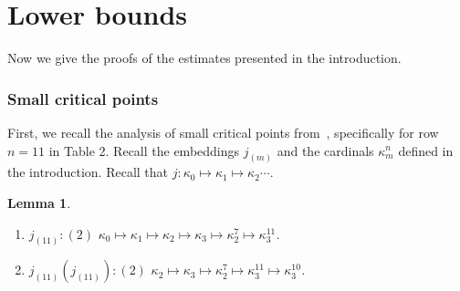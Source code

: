 \documentclass{article}
\newtheorem{lemma}{Lemma}[section]
\theoremstyle{definition}
\theoremstyle{remark}
\begin{document}



\section{Lower bounds}
\label{sec:lower_bounds}

Now we give the proofs of the estimates presented in the introduction.


\subsubsection*{Small critical points}

First, we recall the analysis of small critical points from~\cite{Dougherty}, specifically for row $n=11$ in Table 2. Recall the embeddings $j_{(m)}$ and the cardinals $\kappa^n_m$ defined in the introduction. Recall that $j : \kappa_0\mapsto \kappa_1 \mapsto \kappa_2 \cdots$. 

\begin{lemma} \label{lem:dougherty_summary} \
  \begin{enumerate}
    \item $j_{(11)}:(2) \,\,\kappa_0 \mapsto \kappa_1 \mapsto \kappa_2\mapsto \kappa_3\mapsto \kappa_2^7 \mapsto \kappa_3^{11}$. 

    \item $j_{(11)}(j_{(11)}):(2)\,\, \kappa_2\mapsto \kappa_3\mapsto \kappa_2^7 \mapsto \kappa_3^{11} \mapsto \kappa_3^{10}$. 
  \end{enumerate}
\end{lemma}
\end{document}
